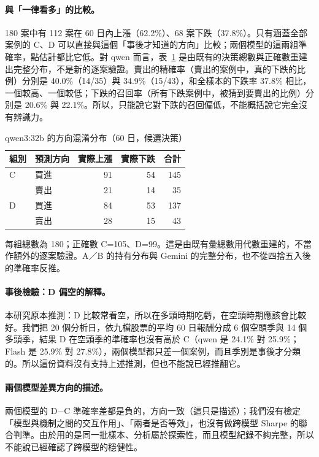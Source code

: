 \documentclass[12pt,a4paper]{article}
\numberwithin{table}{section}
\numberwithin{figure}{section}
\newcommand{\grp}[1]{\textsf{#1}}
\begin{document}
\paragraph{與「一律看多」的比較。} 180 案中有 112 案在 60 日內上漲（62.2\%）、68 案下跌（37.8\%）。只有涵蓋全部案例的 \grp{C}、\grp{D} 可以直接與這個「事後才知道的方向」比較；兩個模型的這兩組準確率，點估計都比它低。對 qwen 而言，表~\ref{tab:confusion} 是由既有的決策總數與正確數重建出完整分布，不是新的逐案驗證。賣出的精確率（賣出的案例中，真的下跌的比例）分別是 40.0\%（14/35）與 34.9\%（15/43），和全樣本的下跌率 37.8\% 相比，一個較高、一個較低；下跌的召回率（所有下跌案例中，被猜到要賣出的比例）分別是 20.6\% 與 22.1\%。所以，只能說它對下跌的召回偏低，不能概括說它完全沒有辨識力。

\begin{table}[H]
\centering\small
\caption{qwen3:32b 的方向混淆分布（60 日，候選決策）}
\label{tab:confusion}
\begin{tabular}{@{}llrrr@{}}
\toprule
組別 & 預測方向 & 實際上漲 & 實際下跌 & 合計 \\
\midrule
\grp{C} & 買進 & 91 & 54 & 145 \\
         & 賣出 & 21 & 14 & 35 \\
\grp{D} & 買進 & 84 & 53 & 137 \\
         & 賣出 & 28 & 15 & 43 \\
\bottomrule
\end{tabular}
\par\smallskip
\raggedright\footnotesize 每組總數為 180；正確數 C=105、D=99。這是由既有彙總數用代數重建的，不當作額外的逐案驗證。A／B 的持有分布與 Gemini 的完整分布，也不從四捨五入後的準確率反推。
\end{table}

\paragraph{事後檢驗：\grp{D} 偏空的解釋。} 本研究原本推測：\grp{D} 比較常看空，所以在多頭時期吃虧，在空頭時期應該會比較好。我們把 20 個分析日，依九檔股票的平均 60 日報酬分成 6 個空頭季與 14 個多頭季，結果 \grp{D} 在空頭季的準確率也沒有高於 \grp{C}（qwen 是 24.1\% 對 25.9\%；Flash 是 25.9\% 對 27.8\%），兩個模型都只差一個案例，而且季別是事後才分類的。所以這份資料沒有支持上述推測，但也不能說已經推翻它。

\paragraph{兩個模型差異方向的描述。} 兩個模型的 \grp{D}$-$\grp{C} 準確率差都是負的，方向一致（這只是描述）；我們沒有檢定「模型與機制之間的交互作用」、「兩者是否等效」，也沒有做跨模型 Sharpe 的聯合判準。由於用的是同一批樣本、分析屬於探索性，而且模型紀錄不夠完整，所以不能說已經確認了跨模型的穩健性。
\end{document}
